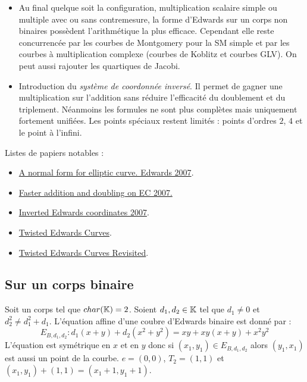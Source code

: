 \documentclass[a4paper]{report}
\begin{document}
\begin{itemize}[label=--]
    \item Au final quelque soit la configuration, multiplication scalaire simple ou multiple avec ou sans contremesure, la forme d'Edwards sur un corps non binaires possèdent l'arithmétique la plus efficace. Cependant elle reste concurrencée par les courbes de Montgomery pour la SM simple et par les courbes à multiplication complexe (courbes de Koblitz et courbes GLV). On peut aussi rajouter les quartiques de Jacobi.
    \item Introduction du \emph{système de coordonnée inversé}. Il permet de gagner une multiplication sur l'addition sans réduire l'efficacité du doublement et du triplement. Néanmoins les formules ne sont plus complètes mais uniquement fortement unifiées. Les points spéciaux restent limités : points d'ordres $2$, $4$ et le point à l'infini.
\end{itemize}

\noindent Listes de papiers notables :
\begin{itemize}[label=--]
    \item \href{http://citeseerx.ist.psu.edu/viewdoc/summary?doi=10.1.1.139.567}{A normal form for elliptic curve. Edwards 2007}.
    \item \href{http://cr.yp.to/newelliptic/newelliptic-20070906.pdf}{Faster addition and doubling on EC 2007.}
    \item \href{http://eprint.iacr.org/2007/410.pdf}{Inverted Edwards coordinates 2007}.
    \item \href{http://eprint.iacr.org/2008/013.pdf}{Twisted Edwards Curves}.
    \item \href{http://eprint.iacr.org/2008/522.pdf}{Twisted Edwards Curves Revisited}.
\end{itemize}

\subsection{Sur un corps binaire}
\begin{definition}
Soit \field{} un corps tel que $char(\mathbb{K}{}) = 2$. Soient $d_1, d_2 \in \mathbb{K}{}$ tel que $d_1 \neq 0$ et $d_2^2 \neq d_1^2 + d_1$. L'équation affine d'une coubre d'Edwards binaire est donné par :
$$E_{B, d_1, d_2} : d_1(x+y) + d_2(x^2 + y^2) = xy + xy(x + y) + x^2y^2$$
L'équation est symétrique en $x$ et en $y$ donc si $(x_1, y_1) \in E_{B, d_1, d_2}$ alors $(y_1, x_1)$ est aussi un point de la courbe. $e = (0, 0)$, $T_2 = (1, 1)$ et $(x_1, y_1) + (1, 1) = (x_1 + 1, y_1 +1)$.
\end{definition}
\end{document}
